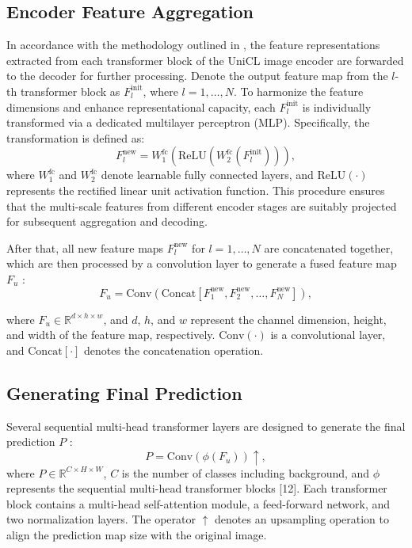 \subsection{Encoder Feature Aggregation}
\label{subsec:en_feature_agg}
In accordance with the methodology outlined in \cite{wsss_frozen_clip}, the feature representations extracted from each transformer block of the UniCL image encoder \cite{vl_unicl} are forwarded to the decoder for further processing. Denote the output feature map from the $l$-th transformer block as \( F_l^{\text{init}} \), where \( l = 1, \dots, N \). To harmonize the feature dimensions and enhance representational capacity, each \( F_l^{\text{init}} \) is individually transformed via a dedicated multilayer perceptron (MLP). Specifically, the transformation is defined as:
\begin{equation}
    F_l^{\text{new}} = W_{1}^{\text{fc}} \left( \text{ReLU} \left( W_{2}^{\text{fc}}(F_l^{\text{init}}) \right) \right),
\end{equation}
where \( W_{1}^{\text{fc}} \) and \( W_{2}^{\text{fc}} \) denote learnable fully connected layers, and \(\text{ReLU}(\cdot)\) represents the rectified linear unit activation function. This procedure ensures that the multi-scale features from different encoder stages are suitably projected for subsequent aggregation and decoding.


After that, all new feature maps \( F_l^{\text{new}} \) for \( l = 1, \dots, N \) are concatenated together, which are then processed by a convolution layer to generate a fused feature map \( F_u \) \cite{wsss_frozen_clip}:
\begin{equation}
    F_u = \text{Conv}\left( \text{Concat}\left[ F_1^{\text{new}}, F_2^{\text{new}}, \dots, F_N^{\text{new}} \right] \right),
    \tag{2}
\end{equation}

where \( F_u \in \mathbb{R}^{d \times h \times w} \), and \( d \), \( h \), and \( w \) represent the channel dimension, height, and width of the feature map, respectively. \(\text{Conv}(\cdot)\) is a convolutional layer, and \(\text{Concat}[\cdot]\) denotes the concatenation operation.


\subsection{Generating Final Prediction}
\label{subsec:decoder_final_pred}

Several sequential multi-head transformer layers are designed to generate the final prediction \( P \) \cite{wsss_frozen_clip}:
\begin{equation}
    \label{eq:prediction}
    P = \text{Conv}(\phi(F_u)) \uparrow,
\end{equation}
where \( P \in \mathbb{R}^{C \times H \times W} \), \( C \) is the number of classes including background, and \(\phi\) represents the sequential multi-head transformer blocks [12]. Each transformer block contains a multi-head self-attention module, a feed-forward network, and two normalization layers. The operator \(\uparrow\) denotes an upsampling operation to align the prediction map size with the original image.


